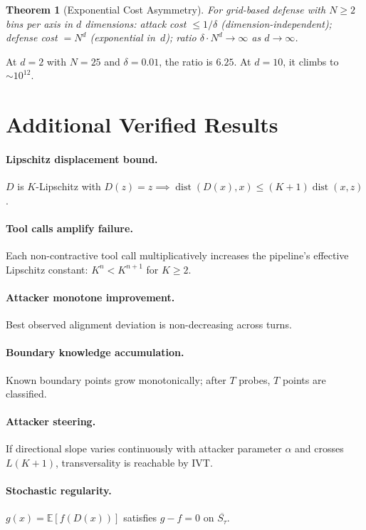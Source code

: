 \documentclass[11pt]{article}
\newtheorem{theorem}{Theorem}[section]
\newcommand{\cl}[1]{\overline{#1}}
\newcommand{\dist}{\operatorname{dist}}
\begin{document}
\begin{theorem}[Exponential Cost Asymmetry]
\label{thm:cost}
For grid-based defense with $N \geq 2$ bins per axis in $d$ dimensions:
attack cost $\leq 1/\delta$ (dimension-independent); defense cost
$= N^d$ (exponential in~$d$); ratio
$\delta \cdot N^d \to \infty$ as $d\to\infty$.
\end{theorem}

At $d=2$ with $N=25$ and $\delta=0.01$, the ratio is $6.25$.
At $d=10$, it climbs to $\sim 10^{12}$.


\section{Additional Verified Results}
\label{app:additional}

\paragraph{Lipschitz displacement bound.}
$D$ is $K$-Lipschitz with $D(z) = z \implies
\dist(D(x), x) \leq (K{+}1)\dist(x,z)$.

\paragraph{Tool calls amplify failure.}
Each non-contractive tool call multiplicatively increases the pipeline's
effective Lipschitz constant: $K^n < K^{n+1}$ for $K \geq 2$.

\paragraph{Attacker monotone improvement.}
Best observed alignment deviation is non-decreasing across turns.

\paragraph{Boundary knowledge accumulation.}
Known boundary points grow monotonically; after $T$ probes, $T$ points
are classified.

\paragraph{Attacker steering.}
If directional slope varies continuously with attacker parameter $\alpha$
and crosses $L(K{+}1)$, transversality is reachable by IVT.

\paragraph{Stochastic regularity.}
$g(x) = \mathbb{E}[f(D(x))]$ satisfies $g - f = 0$ on $\cl{S_\tau}$.
\end{document}
